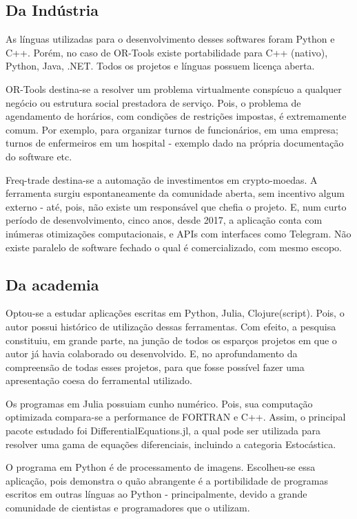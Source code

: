 \documentclass[
12pt,				%
openright,			%
oneside,			%
a4paper,			%
english,			%
french,				%
spanish,			%
brazil,				%
]{abntex2}
\begin{document}
\subsection{Da Indústria}
As línguas utilizadas para o desenvolvimento desses softwares foram
Python e C++. Porém, no caso de OR-Tools existe portabilidade para
C++ (nativo), Python, Java, .NET. Todos os projetos e línguas possuem licença aberta.

OR-Tools destina-se a resolver um problema virtualmente
conspícuo a qualquer negócio ou estrutura social prestadora de
serviço. Pois, o problema de agendamento de horários, com condições de
restrições impostas, é extremamente comum. Por exemplo, para organizar
turnos de funcionários, em uma empresa; turnos de enfermeiros em um
hospital - exemplo dado na própria documentação do software etc.

Freq-trade destina-se a automação de investimentos em
crypto-moedas. A ferramenta surgiu espontaneamente da comunidade
aberta, sem incentivo algum externo - até, pois, não existe um
responsável que chefia o projeto. E, num curto período de
desenvolvimento, cinco anos, desde 2017, a aplicação conta com
inúmeras otimizações computacionais, e APIs com interfaces como
Telegram. Não existe paralelo de software fechado o qual é
comercializado, com mesmo escopo.

\subsection{Da academia}
\label{subsec:res-academia}

Optou-se a estudar aplicações escritas em Python, Julia,
Clojure(script). Pois, o autor possui histórico de
utilização dessas ferramentas. Com efeito, a pesquisa constituiu, em
grande parte, na junção de todos os esparços projetos em que o autor
já havia colaborado ou desenvolvido. E, no aprofundamento da
compreensão de todas esses projetos, para que fosse possível fazer uma
apresentação coesa do ferramental utilizado.

Os programas em Julia possuiam cunho numérico. Pois, sua computação
optimizada compara-se a performance de FORTRAN e C++. Assim, o
principal pacote estudado foi DifferentialEquations.jl, a qual pode
ser utilizada para resolver uma gama de equações diferenciais,
incluindo a categoria Estocástica.

O programa em Python é de processamento de imagens. Escolheu-se essa
aplicação, pois demonstra o quão abrangente é a portibilidade de
programas escritos em outras línguas ao Python - principalmente,
devido a grande comunidade de cientistas e programadores que o
utilizam.
\end{document}
